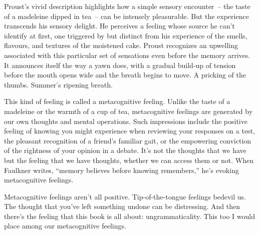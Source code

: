 Proust's vivid description highlights how a simple sensory encounter~-- the taste of a madeleine dipped in tea~-- can be intensely pleasurable. But the experience transcends his sensory delight. He perceives a feeling whose source he can't identify at first, one triggered by but distinct from his experience of the smells, flavours, and textures of the moistened cake. Proust recognizes an upwelling associated with this particular set of sensations even before the memory arrives. It announces itself the way a yawn does, with a gradual build-up of tension before the mouth opens wide and the breath begins to move. A pricking of the thumbs. Summer's ripening breath.

This kind of feeling is called a metacognitive feeling. Unlike the taste of a madeleine or the warmth of a cup of tea, metacognitive feelings are generated by our own thoughts and mental operations. Such impressions include the positive feeling of knowing you might experience when reviewing your responses on a test, the pleasant recognition of a friend's familiar gait, or the empowering conviction of the rightness of your opinion in a debate. It's not the thoughts that we have but the feeling that we have thoughts, whether we can access them or not. When Faulkner writes, \enquote{memory believes before knowing remembers,} he's evoking metacognitive feelings.

Metacognitive feelings aren't all positive. Tip-of-the-tongue feelings bedevil us. The thought that you've left something undone can be distressing. And then there's the feeling that this book is all about: ungrammaticality. This too I would place among our metacognitive feelings.




